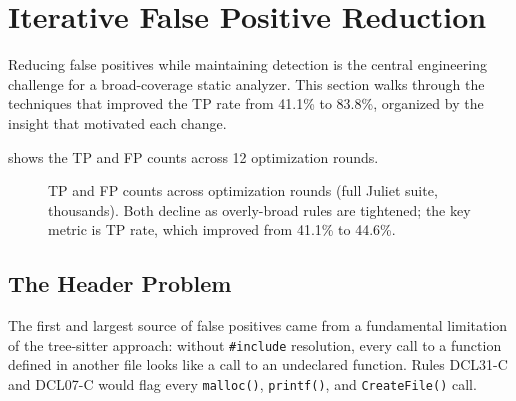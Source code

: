 \section{Iterative False Positive Reduction}
\label{sec:fp-reduction}

Reducing false positives while maintaining detection is the central
engineering challenge for a broad-coverage static analyzer.  This
section walks through the techniques that improved the TP rate from
41.1\% to 83.8\%, organized by the insight that motivated each change.

 shows the TP and FP counts across 12
optimization rounds.

\begin{figure}[t]
\centering
{}
\caption{TP and FP counts across optimization rounds (full Juliet
suite, thousands).  Both decline as overly-broad rules are tightened;
the key metric is TP rate, which improved from 41.1\% to 44.6\%.}
\label{fig:fp-reduction}
\end{figure}

\subsection{The Header Problem}
\label{sec:fp-cross-file}

The first and largest source of false positives came from a fundamental
limitation of the tree-sitter approach: without \texttt{\#include}
resolution, every call to a function defined in another file looks like
a call to an undeclared function.  Rules DCL31-C and DCL07-C would flag
every \texttt{malloc()}, \texttt{printf()}, and \texttt{CreateFile()}
call.

